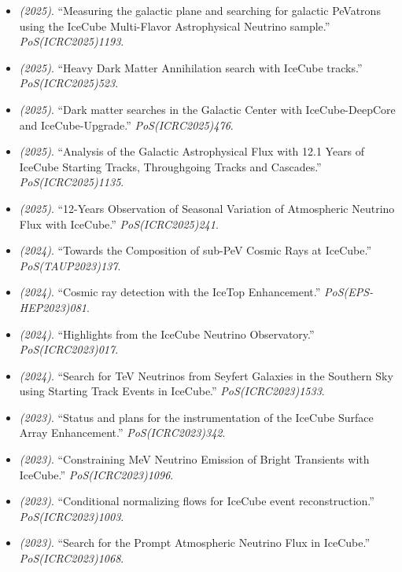 \begin{itemize}
\item \textit{(2025)}. ``Measuring the galactic plane and searching for galactic PeVatrons using the IceCube Multi-Flavor Astrophysical Neutrino sample.'' \textit{PoS(ICRC2025)1193}. 
\item \textit{(2025)}. ``Heavy Dark Matter Annihilation search with IceCube tracks.'' \textit{PoS(ICRC2025)523}. 
\item \textit{(2025)}. ``Dark matter searches in the Galactic Center with IceCube-DeepCore and IceCube-Upgrade.'' \textit{PoS(ICRC2025)476}. 
\item \textit{(2025)}. ``Analysis of the Galactic Astrophysical Flux with 12.1 Years of IceCube Starting Tracks, Throughgoing Tracks and Cascades.'' \textit{PoS(ICRC2025)1135}. 
\item \textit{(2025)}. ``12-Years Observation of Seasonal Variation of Atmospheric Neutrino Flux with IceCube.'' \textit{PoS(ICRC2025)241}. 
\item \textit{(2024)}. ``Towards the Composition of sub-PeV Cosmic Rays at IceCube.'' \textit{PoS(TAUP2023)137}.  
\item \textit{(2024)}. ``Cosmic ray detection with the IceTop Enhancement.'' \textit{PoS(EPS-HEP2023)081}.  
\item \textit{(2024)}. ``Highlights from the IceCube Neutrino Observatory.'' \textit{PoS(ICRC2023)017}.  
\item \textit{(2024)}. ``Search for TeV Neutrinos from Seyfert Galaxies in the Southern Sky using Starting Track Events in IceCube.'' \textit{PoS(ICRC2023)1533}.  
\item \textit{(2023)}. ``Status and plans for the instrumentation of the IceCube Surface Array Enhancement.'' \textit{PoS(ICRC2023)342}.  
\item \textit{(2023)}. ``Constraining MeV Neutrino Emission of Bright Transients with IceCube.'' \textit{PoS(ICRC2023)1096}.  
\item \textit{(2023)}. ``Conditional normalizing flows for IceCube event reconstruction.'' \textit{PoS(ICRC2023)1003}.  
\item \textit{(2023)}. ``Search for the Prompt Atmospheric Neutrino Flux in IceCube.'' \textit{PoS(ICRC2023)1068}.  

\end{itemize}
